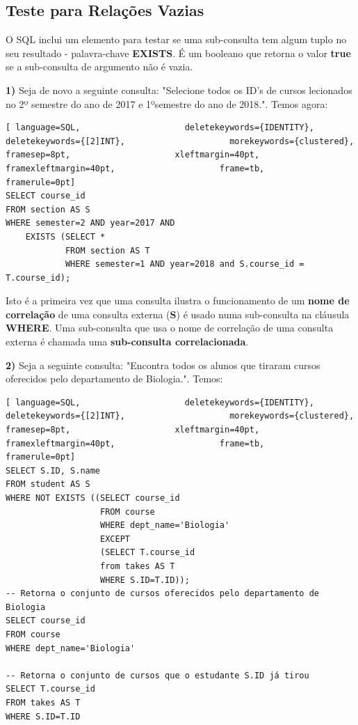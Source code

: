 \documentclass[oneside]{book}
\theoremstyle{definition}
\begin{document}
\subsection{Teste para Relações Vazias}
O SQL inclui um elemento para testar se uma sub-consulta tem algum tuplo no seu resultado - palavra-chave \textbf{EXISTS}. É um booleano que retorna o valor \textbf{true} se a sub-consulta de argumento não é vazia.

\textbf{1)} Seja de novo a seguinte consulta: "Selecione todos os ID's de cursos lecionados no 2º semestre do ano de 2017 e 1ºsemestre do ano de 2018.". Temos agora:
\begin{lstlisting}[ language=SQL,                     deletekeywords={IDENTITY},                     deletekeywords={[2]INT},                     morekeywords={clustered},                     framesep=8pt,                     xleftmargin=40pt,                     framexleftmargin=40pt,                     frame=tb,                     framerule=0pt]
SELECT course_id
FROM section AS S 
WHERE semester=2 AND year=2017 AND
    EXISTS (SELECT *
            FROM section AS T
            WHERE semester=1 AND year=2018 and S.course_id = T.course_id);
\end{lstlisting}
Isto é a primeira vez que uma consulta ilustra o funcionamento de um \textbf{nome de correlação} de uma consulta externa (\textbf{S}) é usado numa sub-consulta na cláusula \textbf{WHERE}. Uma sub-consulta que usa o nome de correlação de uma consulta externa é chamada uma \textbf{sub-consulta correlacionada}.

\textbf{2)} Seja a seguinte consulta: "Encontra todos os alunos que tiraram cursos oferecidos pelo departamento de Biologia.". Temos:
\begin{lstlisting}[ language=SQL,                     deletekeywords={IDENTITY},                     deletekeywords={[2]INT},                     morekeywords={clustered},                     framesep=8pt,                     xleftmargin=40pt,                     framexleftmargin=40pt,                     frame=tb,                     framerule=0pt]
SELECT S.ID, S.name
FROM student AS S 
WHERE NOT EXISTS ((SELECT course_id
                   FROM course
                   WHERE dept_name='Biologia'
                   EXCEPT
                   (SELECT T.course_id
                   from takes AS T
                   WHERE S.ID=T.ID));
-- Retorna o conjunto de cursos oferecidos pelo departamento de Biologia
SELECT course_id
FROM course
WHERE dept_name='Biologia'

-- Retorna o conjunto de cursos que o estudante S.ID já tirou
SELECT T.course_id
FROM takes AS T
WHERE S.ID=T.ID
\end{lstlisting}
\end{document}
